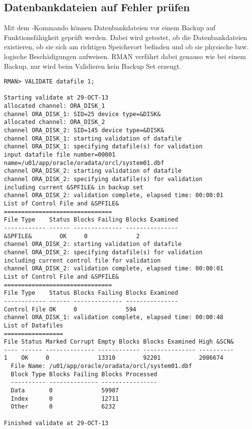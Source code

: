       \subsection{Datenbankdateien auf Fehler prüfen}
        Mit dem -Kommando können Datenbankdateien vor einem Backup auf Funktionsfähigkeit geprüft werden. Dabei wird getestet, ob die Datenbankdateien existieren, ob sie sich am richtigen Speicherort befinden und ob sie physische bzw. logische Beschädigungen aufweisen. RMAN verfährt dabei genauso wie bei einem Backup, nur wird beim Validieren kein Backup Set erzeugt.
\clearpage
        \begin{lstlisting}[caption={Eine Datendatei validieren},label=admin1400,language=rman]
RMAN> VALIDATE datafile 1;

Starting validate at 29-OCT-13
allocated channel: ORA_DISK_1
channel ORA_DISK_1: SID=25 device type=&DISK&
allocated channel: ORA_DISK_2
channel ORA_DISK_2: SID=145 device type=&DISK&
channel ORA_DISK_1: starting validation of datafile
channel ORA_DISK_1: specifying datafile(s) for validation
input datafile file number=00001 name=/u01/app/oracle/oradata/orcl/system01.dbf
channel ORA_DISK_2: starting validation of datafile
channel ORA_DISK_2: specifying datafile(s) for validation
including current &SPFILE& in backup set
channel ORA_DISK_2: validation complete, elapsed time: 00:00:01
List of Control File and &SPFILE&
===============================
File Type    Status Blocks Failing Blocks Examined
------------ ------ -------------- ---------------
&SPFILE&        OK     0              2
channel ORA_DISK_2: starting validation of datafile
channel ORA_DISK_2: specifying datafile(s) for validation
including current control file for validation
channel ORA_DISK_2: validation complete, elapsed time: 00:00:01
List of Control File and &SPFILE&
===============================
File Type    Status Blocks Failing Blocks Examined
------------ ------ -------------- ---------------
Control File OK     0              594
channel ORA_DISK_1: validation complete, elapsed time: 00:00:48
List of Datafiles
=================
File Status Marked Corrupt Empty Blocks Blocks Examined High &SCN&
---- ------ -------------- ------------ --------------- ----------
1    OK     0              13310        92201           2086674
  File Name: /u01/app/oracle/oradata/orcl/system01.dbf
  Block Type Blocks Failing Blocks Processed
  ---------- -------------- ----------------
  Data       0              59907
  Index      0              12711
  Other      0              6232

Finished validate at 29-OCT-13
        \end{lstlisting}
